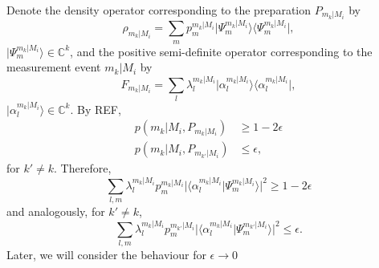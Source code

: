Denote the density operator corresponding to the preparation $P_{m_k\vert M_i}$ by 
\begin{equation}
\rho_{m_k\vert M_i} = \sum_m p_m^{m_k\vert M_i} \vert \Psi_m^{m_k\vert M_i}\rangle\langle \Psi_m^{m_k\vert M_i} \vert,
\end{equation} $\vert \Psi_m^{m_k\vert M_i} \rangle \in \mathbb{C}^k$, and the positive semi-definite operator corresponding to the measurement event $m_k\vert M_i$ by
\begin{equation}
F_{m_k\vert M_i}=\sum_l \lambda_l^{m_k\vert M_i} \vert \alpha_l^{m_k\vert M_i}\rangle \langle \alpha_l^{m_k\vert M_i} \vert,
\end{equation} $\vert \alpha_l^{m_k\vert M_i} \rangle \in \mathbb{C}^k$.
By REF,
\begin{align}
p(m_k\vert M_i, P_{m_k\vert M_i}) & \geq 1-2\epsilon \\
p(m_k\vert M_i, P_{m_{k'}\vert M_i}) & \leq \epsilon,
\end{align}
for $k'\neq k$.
Therefore,
\begin{equation}
\sum_{l,m}\lambda_l^{m_k\vert M_i}p_m^{m_k\vert M_i}\vert \langle \alpha_l^{m_k\vert M_i} \vert \Psi_m^{m_k\vert M_i} \rangle \vert^2 \geq 1-2\epsilon
\end{equation}
and analogously, for $k'\neq k$,
\begin{equation}
\sum_{l,m}\lambda_l^{m_k\vert M_i}p_m^{m_{k'}\vert M_i}\vert \langle \alpha_l^{m_k\vert M_i} \vert \Psi_m^{m_{k'}\vert M_i} \rangle \vert^2 \leq \epsilon.
\end{equation}
Later, we will consider the behaviour for $\epsilon\rightarrow 0$

